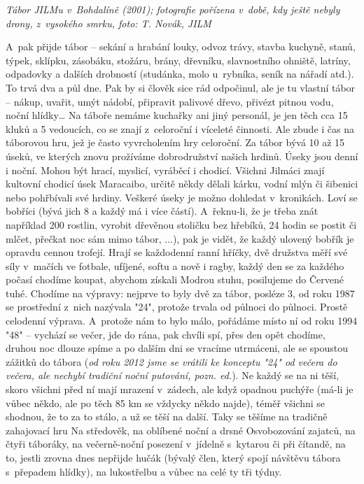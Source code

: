 \documentclass[a5paper, 12pt, twoside]{article}
\begin{document}

\textit{Tábor JILMu v~Bohdalíně (2001); fotografie pořízena v~době, kdy
ještě nebyly drony, z~vysokého smrku, foto: T. Novák, JILM}

A~pak přijde tábor -- sekání a hrabání louky, odvoz trávy, stavba
kuchyně, stanů, týpek, sklípku, zásobáku, stožáru, brány, dřevníku,
slavnostního ohniště, latríny, odpadovky a dalších drobností (studánka,
molo u~rybníka, seník na nářadí atd.). To trvá dva a půl dne. Pak by si
člověk sice rád odpočinul, ale je tu vlastní tábor -- nákup, uvařit,
umýt nádobí, připravit palivové dřevo, přivézt pitnou vodu, noční
hlídky\ldots{} Na táboře nemáme kuchařky ani jiný personál, je jen těch
cca 15 kluků a 5 vedoucích, co se znají z~celoroční i víceleté činnosti.
Ale zbude i čas na táborovou hru, jež je často vyvrcholením hry
celoroční. Za tábor bývá 10 až 15 úseků, ve kterých znovu prožíváme
dobrodružství našich hrdinů. Úseky jsou denní i noční. Mohou být hrací,
myslicí, vyráběcí i chodicí. Všichni Jilmáci znají kultovní chodicí úsek
Maracaibo, určitě někdy dělali kárku, vodní mlýn či šibenici nebo
pohřbívali své hrdiny. Veškeré úseky je možno dohledat v~kronikách. Loví
se bobříci (bývá jich 8 a každý má i více částí). A~řeknu-li, že je
třeba znát například 200 rostlin, vyrobit dřevěnou stoličku bez hřebíků,
24 hodin se postit či mlčet, přečkat noc sám mimo tábor, ...), pak je
vidět, že každý ulovený bobřík je opravdu cennou trofejí. Hrají se
každodenní ranní hříčky, dvě družstva měří své síly v~mačích ve fotbale,
ufíjené, softu a nově i ragby, každý den se za každého počasí chodíme
koupat, abychom získali Modrou stuhu, posilujeme do Červené tuhé.
Chodíme na výpravy: nejprve to byly dvě za tábor, posléze 3, od roku
1987 se prostřední z~nich nazývala "24", protože trvala od půlnoci do
půlnoci. Prostě celodenní výprava. A~protože nám to bylo málo, pořádáme
místo ní od roku 1994 "48" -- vychází se večer, jde do rána, pak chvíli
spí, přes den opět chodíme, druhou noc dlouze spíme a po dalším dni se
vracíme utrmáceni, ale se spoustou zážitků do tábora (\textit{od roku 2012
jsme se vrátili ke konceptu "24" od večera do večera, ale nechybí
tradiční noční putování, pozn. ed.}). Ne každý se na ni těší, skoro
všichni před ní mají mrazení v~zádech, ale když opadnou puchýře (má-li
je vůbec někdo, ale po těch 85 km se vždycky někdo najde), téměř všichni
se shodnou, že to za to stálo, a už se těší na další. Taky se těšíme na
tradičně zahajovací hru Na středověk, na oblíbené noční a drsné
Osvobozování zajatců, na čtyři táboráky, na večerně-noční posezení
v~jídelně s~kytarou či při čítandě, na to, jestli zrovna dnes nepřijde
hučák (bývalý člen, který spojí návštěvu tábora s~přepadem hlídky), na
lukostřelbu a vůbec na celé ty tři týdny.
\end{document}
